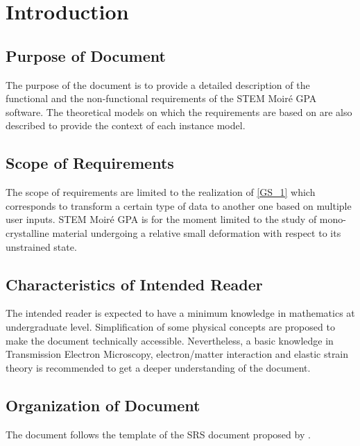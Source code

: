 \documentclass[12pt]{article}
\newcommand{\progname}{STEM Moir{\'e} GPA}
\begin{document}
\newpage
{}

\section{Introduction}

\subsection{Purpose of Document}

The purpose of the document is to provide a detailed description of the 
functional and the non-functional requirements of the \progname{} software.  The 
theoretical models on which the requirements are based on are also described to 
provide the context of each instance model.

\subsection{Scope of Requirements} 

The scope of requirements are limited to the realization of \cref{GS_1} which 
corresponds to transform a certain type of data to another one based on multiple 
user inputs. \progname{} is for the moment limited to the study of 
mono-crystalline material undergoing a relative small deformation with respect 
to its unstrained state.

\subsection{Characteristics of Intended Reader} 

The intended reader is expected to have a minimum knowledge in mathematics at
undergraduate level. Simplification of some physical concepts are proposed to
make the document technically accessible. Nevertheless, a basic knowledge in
Transmission Electron Microscopy, electron/matter interaction and elastic strain
theory is recommended to get a deeper understanding of the document. 

\subsection{Organization of Document}

The document follows the template of the SRS document proposed by 
\cite{SmithAndLai2005, SmithEtAl2007}. 
\end{document}
